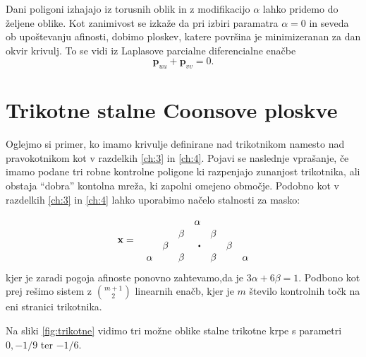 \documentclass[a4paper,12pt]{article}
\begin{document}
Dani poligoni izhajajo iz torusnih oblik in z modifikacijo $\alpha$ lahko pridemo do željene oblike.
Kot zanimivost se izkaže da pri izbiri paramatra $\alpha = 0$ in seveda ob upoštevanju afinosti,
dobimo ploskev, katere površina je minimizeranan za dan okvir krivulj. To se vidi iz Laplasove parcialne 
diferencialne enačbe
$$\mathbf{p}_{uu} + \mathbf{p}_{vv} = 0.$$


\section{Trikotne stalne Coonsove ploskve}

Oglejmo si primer, ko imamo krivulje definirane nad trikotnikom 
namesto nad pravokotnikom kot v razdelkih \ref{ch:3} in \ref{ch:4}.
Pojavi se naslednje vprašanje, če imamo podane tri robne kontrolne poligone 
ki razpenjajo zunanjost trikotnika, ali obstaja  ``dobra''
kontolna mreža, ki zapolni omejeno območje. 
Podobno kot v razdelkih \ref{ch:3} in \ref{ch:4} lahko uporabimo načelo 
stalnosti za masko:

$$
\mathbf{x} =  \quad 
\begin{matrix*}[r]
          &       &       & \alpha   &       &       & \\
          &       & \beta &          & \beta &       & \\
          & \beta &       & \sbullet &       & \beta & \\
   \alpha &       & \beta &          & \beta &       & \alpha
\end{matrix*}
$$
kjer je zaradi pogoja afinoste ponovno zahtevamo,da je $3\alpha + 6\beta = 1$.
Podbono kot prej rešimo sistem z $\binom{m+1}{2}$ linearnih enačb, 
kjer je $m$ število kontrolnih točk na eni stranici trikotnika.

Na sliki \ref{fig:trikotne} vidimo tri možne oblike stalne trikotne
krpe s parametri $0,-1/9$ ter $-1/6$.
\end{document}
